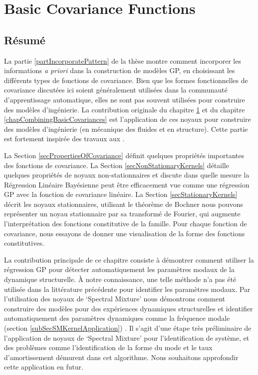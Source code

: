 \chapter{Basic Covariance Functions}
\label{chapBasicCovarianceKernels}

\begin{mdframed}[hidealllines=true,backgroundcolor=lightgray!20]
\section*{Résumé}
La partie \ref{partIncorporatePattern} de la thèse montre comment incorporer les informations \textit{a priori} dans la construction de modèles GP, en choisissant les différents types de fonctions de covariance. Bien que les formes fonctionnelles de covariance discutées ici soient généralement utilisées dans la communauté d'apprentissage automatique, elles ne sont pas souvent utilisées pour construire des modèles d'ingénierie. La contribution originale du chapitre \ref{chapBasicCovarianceKernels} et du chapitre \ref{chapCombiningBasicCovariances} est l'application de ces noyaux pour construire des modèles d'ingénierie (en mécanique des fluides et en structure). Cette partie est fortement inspirée des travaux aux \cite{duvenaud-thesis-2014, wilson2014thesis, lloyd2014automatic, durrande2001etude}.

La Section \ref{secPropertiesOfCovariance} définit quelques propriétés importantes des fonctions de covariance. La Section \ref{secNonStationaryKernels}  détaille quelques propriétés de noyaux non-stationnaires et discute dans quelle mesure la Régression Linéaire Bayésienne peut être efficacement vue comme une régression GP avec la fonction de covariance linéaire. La Section \ref{secStationaryKernels} décrit les noyaux stationnaires, utilisant le théorème de Bochner nous pouvons représenter un noyau stationnaire par sa transformé de Fourier, qui augmente l'interprétation des fonctions constitutive de la famille. Pour chaque fonction de covariance, nous essayons de donner une visualisation de la forme des fonctions constitutives. 

La contribution principale de ce chapitre consiste à démontrer comment utiliser la régression GP pour détecter automatiquement les paramètres modaux de la dynamique structurelle. À notre connaissance, une telle méthode n'a pas été utilisée dans la littérature précédente pour identifier les paramètres modaux. Par l'utilisation des noyaux de `Spectral Mixture’ nous démontrons comment construire des modèles pour des expériences dynamiques structurelles et identifier automatiquement des paramètres dynamiques comme la fréquence modale (section \ref{subSecSMKernelApplication}) \cite{chiplunkar2017operational}. Il s'agit d'une étape très préliminaire de l'application de noyaux de `Spectral Mixture’ pour l'identification de système, et des problèmes comme l'identification de la forme du mode et le taux d'amortissement démurent dans cet algorithme. Nous souhaitons approfondir cette application en futur.

\end{mdframed}


